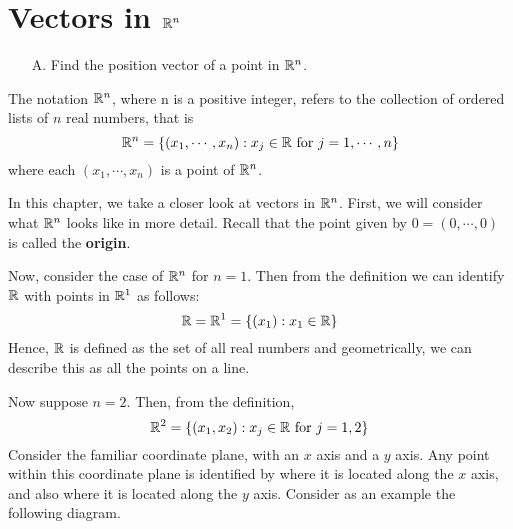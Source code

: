 \section{Vectors in $\mathbb{R}^n$}

\begin{outcome}

\begin{enumerate}
\item[A.] Find the position vector of a point in $\mathbb{R}^n$.
\end{enumerate}
\end{outcome}

The notation $\mathbb{R}^{n}$, where n is a positive integer, refers to the collection of ordered lists of 
$n$ real numbers, that is 
\[
\mathbb{R}^{n} = \left\{ \left( x_{1},\cdots, x_{n}\right)
:x_{j}\in \mathbb{R}\mbox{ for }j=1,\cdots ,n\right\}
\]
where each $\left( x_{1},\cdots, x_{n}\right)$ is a point of $\mathbb{R}^n$.

In this chapter, we take a closer look at vectors in $\mathbb{R}^n$. First, we will consider what $\mathbb{R}^n$ looks like 
in more detail. Recall that the point given by $0=\left( 0, \cdots, 0 \right)$ is called the \textbf{origin}.

Now, consider the case of $\mathbb{R}^n$ for $n=1.$ Then from the definition we can identify 
$\mathbb{R}$ with points in $\mathbb{R}^{1}$ as follows:
\begin{equation*}
\mathbb{R} = \mathbb{R}^{1}=
 \left\{ \left( x_{1}\right) :x_{1}\in \mathbb{R} \right\}
\end{equation*}
Hence, $\mathbb{R}$ is defined as the set of all real numbers and geometrically,
we can describe this as all the points on a line.

Now suppose $n=2$. Then, from the definition,
\begin{equation*}
\mathbb{R}^{2}=
\left\{ \left(x_{1}, x_{2}\right)
:x_{j}\in \mathbb{R}\mbox{ for }j=1,2 \right\}
\end{equation*}
Consider the
familiar coordinate plane, with an $x$ axis and a $y$ axis. Any point
within this coordinate plane is identified by where it is located
along the $x$ axis, and also where it is located along the $y$
axis. Consider as an example the following diagram.

\begin{center}
\end{center}

